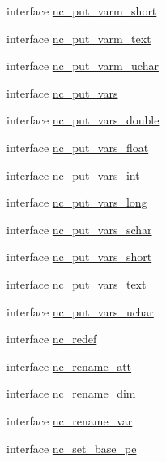 \begin{DoxyCompactItemize}
\item 
interface \hyperlink{interfacenetcdf__nc__interfaces_1_1nc__put__varm__short}{nc\+\_\+put\+\_\+varm\+\_\+short}
\item 
interface \hyperlink{interfacenetcdf__nc__interfaces_1_1nc__put__varm__text}{nc\+\_\+put\+\_\+varm\+\_\+text}
\item 
interface \hyperlink{interfacenetcdf__nc__interfaces_1_1nc__put__varm__uchar}{nc\+\_\+put\+\_\+varm\+\_\+uchar}
\item 
interface \hyperlink{interfacenetcdf__nc__interfaces_1_1nc__put__vars}{nc\+\_\+put\+\_\+vars}
\item 
interface \hyperlink{interfacenetcdf__nc__interfaces_1_1nc__put__vars__double}{nc\+\_\+put\+\_\+vars\+\_\+double}
\item 
interface \hyperlink{interfacenetcdf__nc__interfaces_1_1nc__put__vars__float}{nc\+\_\+put\+\_\+vars\+\_\+float}
\item 
interface \hyperlink{interfacenetcdf__nc__interfaces_1_1nc__put__vars__int}{nc\+\_\+put\+\_\+vars\+\_\+int}
\item 
interface \hyperlink{interfacenetcdf__nc__interfaces_1_1nc__put__vars__long}{nc\+\_\+put\+\_\+vars\+\_\+long}
\item 
interface \hyperlink{interfacenetcdf__nc__interfaces_1_1nc__put__vars__schar}{nc\+\_\+put\+\_\+vars\+\_\+schar}
\item 
interface \hyperlink{interfacenetcdf__nc__interfaces_1_1nc__put__vars__short}{nc\+\_\+put\+\_\+vars\+\_\+short}
\item 
interface \hyperlink{interfacenetcdf__nc__interfaces_1_1nc__put__vars__text}{nc\+\_\+put\+\_\+vars\+\_\+text}
\item 
interface \hyperlink{interfacenetcdf__nc__interfaces_1_1nc__put__vars__uchar}{nc\+\_\+put\+\_\+vars\+\_\+uchar}
\item 
interface \hyperlink{interfacenetcdf__nc__interfaces_1_1nc__redef}{nc\+\_\+redef}
\item 
interface \hyperlink{interfacenetcdf__nc__interfaces_1_1nc__rename__att}{nc\+\_\+rename\+\_\+att}
\item 
interface \hyperlink{interfacenetcdf__nc__interfaces_1_1nc__rename__dim}{nc\+\_\+rename\+\_\+dim}
\item 
interface \hyperlink{interfacenetcdf__nc__interfaces_1_1nc__rename__var}{nc\+\_\+rename\+\_\+var}
\item 
interface \hyperlink{interfacenetcdf__nc__interfaces_1_1nc__set__base__pe}{nc\+\_\+set\+\_\+base\+\_\+pe}
\item 

\end{DoxyCompactItemize}
